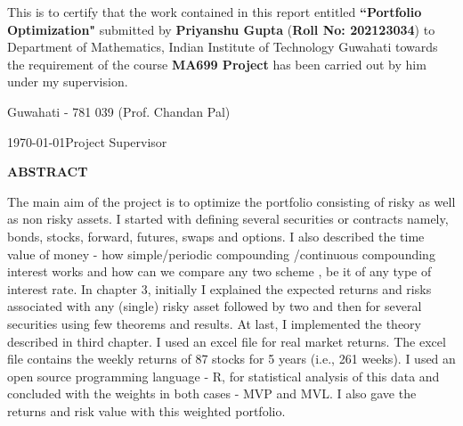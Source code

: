 \documentclass[12pt,a4wide]{report}
\theoremstyle{plain}
\theoremstyle{definition}
\theoremstyle{remark}
\begin{document}
\noindent
This is to certify that the work contained in this report entitled {\textbf{``Portfolio Optimization"}} submitted by \textbf{Priyanshu Gupta} (\textbf{Roll No: 202123034}) to Department of Mathematics, Indian Institute of Technology Guwahati towards the requirement of the course \textbf{MA699 Project} has been carried out by him under my supervision.

\vspace{4cm}

\noindent Guwahati - 781 039 \hfill (Prof. Chandan Pal)

\noindent \mydate\today \hfill Project Supervisor

\clearpage

\begin{center}
{\Large{\bf{ABSTRACT}}}
\end{center} 

The main aim of the project is to optimize the portfolio consisting of risky as well as non risky assets. I started with defining several securities or contracts namely, bonds, stocks, forward, futures, swaps and options. I also described the time value of money - how simple/periodic compounding /continuous compounding interest works and how can we compare any two scheme , be it of any type of interest rate. In chapter 3, initially I explained the expected returns and risks associated with any (single) risky asset followed by two and then for several securities using few theorems and results. At last, I implemented the theory described in third chapter. I used an excel file for real market returns. The excel file contains the weekly returns of 87 stocks for 5 years (i.e., 261 weeks). I used an open source programming language - R, for statistical analysis of this data and concluded with the weights in both cases - MVP and MVL. I also gave the returns and risk value with this weighted portfolio. 

\clearpage



\tableofcontents
\clearpage
\listoffigures


\newpage

\setcounter{page}{1}










\nocite{david}
\nocite{marek}
\nocite{jaksa}



\end{document}
